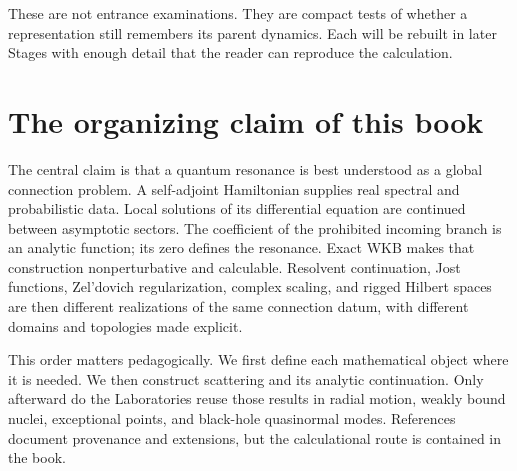 These are not entrance examinations.  They are compact tests of whether a
representation still remembers its parent dynamics.  Each will be rebuilt in
later Stages with enough detail that the reader can reproduce the calculation.

\section*{The organizing claim of this book}
{}

The central claim is that a quantum resonance is best understood as a global
connection problem.  A self-adjoint Hamiltonian supplies real spectral and
probabilistic data.  Local solutions of its differential equation are
continued between asymptotic sectors.  The coefficient of the prohibited
incoming branch is an analytic function; its zero defines the resonance.
Exact WKB makes that construction nonperturbative and calculable.  Resolvent
continuation, Jost functions, Zel'dovich regularization, complex scaling, and
rigged Hilbert spaces are then different realizations of the same connection
datum, with different domains and topologies made explicit.

This order matters pedagogically.  We first define each mathematical object
where it is needed.  We then construct scattering and its analytic
continuation.  Only afterward do the Laboratories reuse those results in
radial motion, weakly bound nuclei, exceptional points, and black-hole
quasinormal modes.  References document provenance and extensions, but the
calculational route is contained in the book.

